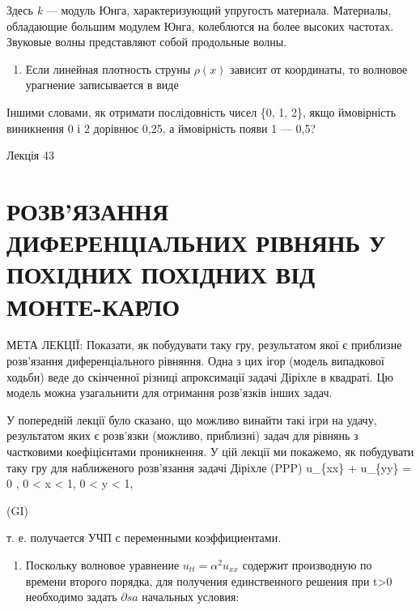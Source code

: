\documentclass[
  ukrainian,
]{article}
\providecommand{\tightlist}{%
  \setlength{\itemsep}{0pt}\setlength{\parskip}{0pt}}
\begin{document}
Здесь \emph{k} --- модуль Юнга, характеризующий упругость материала.
Материалы, обладающие большим модулем Юнга, колеблются на более высоких
частотах. Звуковые волны представляют собой продольные волны.

\begin{enumerate}
\def\labelenumi{\arabic{enumi}.}
\setcounter{enumi}{1}
\tightlist
\item
  Если линейная плотность струны \(\rho(x)\) зависит от координаты, то
  волновое урагнение записывается в виде
\end{enumerate}

Іншими словами, як отримати послідовність чисел \{0, 1, 2\}, якщо
ймовірність виникнення 0 і 2 дорівнює 0,25, а ймовірність появи 1 ---
0,5?

Лекція 43

\section{РОЗВ'ЯЗАННЯ ДИФЕРЕНЦІАЛЬНИХ РІВНЯНЬ У ПОХІДНИХ ПОХІДНИХ ВІД
МОНТЕ-КАРЛО}\label{ux440ux43eux437ux432ux44fux437ux430ux43dux43dux44f-ux434ux438ux444ux435ux440ux435ux43dux446ux456ux430ux43bux44cux43dux438ux445-ux440ux456ux432ux43dux44fux43dux44c-ux443-ux43fux43eux445ux456ux434ux43dux438ux445-ux43fux43eux445ux456ux434ux43dux438ux445-ux432ux456ux434-ux43cux43eux43dux442ux435-ux43aux430ux440ux43bux43e}

МЕТА ЛЕКЦІЇ: Показати, як побудувати таку гру, результатом якої є
приблизне розв'язання диференціального рівняння. Одна з цих ігор (модель
випадкової ходьби) веде до скінченної різниці апроксимації задачі
Діріхле в квадраті. Цю модель можна узагальнити для отримання розв'язків
інших задач.

У попередній лекції було сказано, що можливо винайти такі ігри на удачу,
результатом яких є розв'язки (можливо, приблизні) задач для рівнянь з
частковими коефіцієнтами проникнення. У цій лекції ми покажемо, як
побудувати таку гру для наближеного розв'язання задачі Діріхле (PPP)
u\_\{xx\} + u\_\{yy\} = 0 , 0 \textless{} x \textless{} 1, 0 \textless{}
y \textless{} 1,

(GI)

т. е. получается УЧП с переменными коэффициентами.

\begin{enumerate}
\def\labelenumi{\arabic{enumi}.}
\setcounter{enumi}{2}
\tightlist
\item
  Поскольку волновое уравнение \(u_{tt} = \alpha^2 u_{xx}\) содержит
  производную по времени второго порядка, для получения единственного
  решения при t\textgreater0 необходимо задать \(\partial sa\) начальных
  условия:
\end{enumerate}
\end{document}
